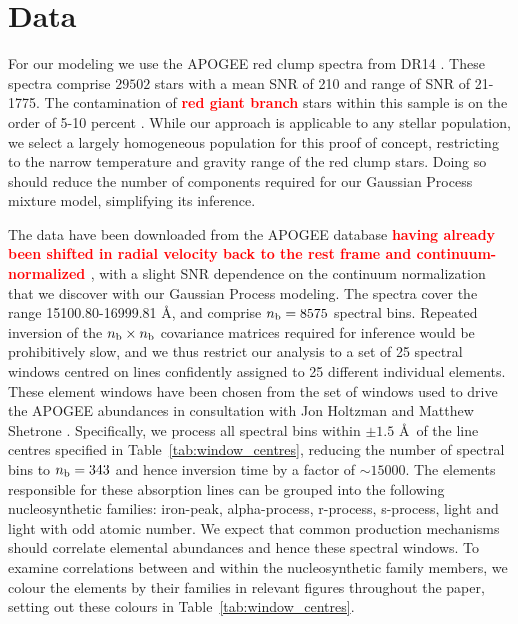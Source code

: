 \documentclass[a4paper,fleqn,usenatbib]{mnras}
\newcommand{\nb}{n_{\rm b}}
\newcommand\edit[1]{\textcolor{red}{\textbf{#1}}}
\begin{document}


\section{Data}
\label{sec:data}

For our modeling we use the APOGEE red clump spectra from DR14 \citep{Majewski2017, Bovy2014}. These spectra comprise $29502$ stars with a mean SNR of 210 and range of SNR of 21-1775.  The contamination of \edit{red giant branch} stars within this sample is on the order of 5-10 percent \citep{Bovy2014}. While our approach is applicable to any stellar population, we select a largely homogeneous population for this proof of concept, restricting to the narrow temperature and gravity range of the red clump stars. Doing so should reduce the number of components required for our Gaussian Process mixture model, simplifying its inference.

The data have been downloaded from the APOGEE database \edit{having already been shifted in radial velocity back to the rest frame and continuum-normalized \citep[see][]{Nidever2015}}, with a slight SNR dependence on the continuum normalization that we discover with our Gaussian Process modeling. The spectra cover the range 15100.80-16999.81 \AA, and comprise $\nb = 8575$ spectral bins. Repeated inversion of the $\nb \times \nb$ covariance matrices required for inference would be prohibitively slow, and we thus restrict our analysis to a set of 25 spectral windows centred on lines confidently assigned to 25 different individual elements. These element windows have been chosen from the set of windows used to drive the APOGEE abundances in consultation with Jon Holtzman and Matthew Shetrone \citep{Holtzman2015, Shetrone2015}. Specifically, we process all spectral bins within $\pm 1.5$ \AA\ of the line centres specified in Table~\ref{tab:window_centres}, reducing the number of spectral bins to $\nb = 343$ and hence inversion time by a factor of $\sim15000$. The elements responsible for these absorption lines can be grouped into the following nucleosynthetic families: iron-peak, alpha-process, r-process, s-process, light and light with odd atomic number. We expect that common production mechanisms should correlate elemental abundances and hence these spectral windows. To examine correlations between and within the nucleosynthetic family members, we colour the elements by their families in relevant figures throughout the paper, setting out these colours in Table~\ref{tab:window_centres}.
\end{document}
